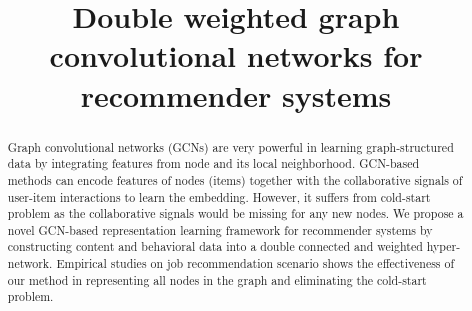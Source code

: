 \documentclass[manuscript,screen,review]{acmart}
\begin{document}
\title{Double weighted graph convolutional networks for recommender systems}

\iffalse
\author{Ben Trovato}
\authornote{Both authors contributed equally to this research.}
\email{trovato@corporation.com}
\orcid{1234-5678-9012}
\author{G.K.M. Tobin}
\authornotemark[1]
\email{webmaster@marysville-ohio.com}
\affiliation{%
  \institution{Institute for Clarity in Documentation}
  \streetaddress{P.O. Box 1212}
  \city{Dublin}
  \state{Ohio}
  \country{USA}
  \postcode{43017-6221}
}
\fi
\renewcommand{\shortauthors}{Trovato and Tobin, et al.}

\begin{abstract}

Graph convolutional networks (GCNs) are very powerful in learning graph-structured data by integrating features from node and its local neighborhood. GCN-based methods can encode features of nodes (items) together with the collaborative signals of user-item interactions to learn the embedding. However, it suffers from cold-start problem as the collaborative signals would be missing for any new nodes. We propose a novel GCN-based representation learning framework for recommender systems by constructing
content and behavioral data into a double connected and weighted hyper-network. Empirical studies on job recommendation scenario shows the effectiveness of our method in representing all nodes in the graph and eliminating the cold-start problem. 
\end{abstract}
\end{document}
